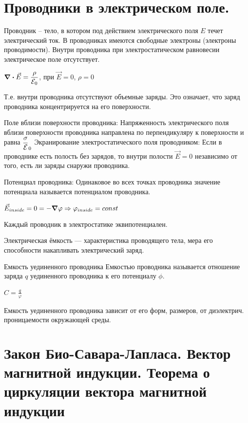 \documentclass[12pt]{report}
\begin{document}
\section{Проводники в электрическом поле.}
Проводник – тело, в котором под действием электрического поля $E$ течет электрический ток. В проводниках имеются свободные электроны (электроны проводимости).  Внутри проводника при электростатическом равновесии электрическое поле отсутствует.
\begin{center}
    $\div\vec{E} = \dfrac{\rho}{\varE_0}$, при $\vec{E} = 0$, $\rho = 0$
\end{center}

Т.е. внутри проводника отсутствуют
объемные заряды. Это означает, что заряд проводника концентрируется
на его поверхности.

Поле вблизи поверхности проводника: Напряженность электрического поля вблизи поверхности проводника направлена по перпендикуляру к поверхности и равна $\dfrac{\sigma}{\varE}_0$ Экранирование электростатического поля проводником: Если в проводнике есть полость без зарядов, то внутри полости $\vec{E} = 0$ независимо от того, есть ли заряды снаружи проводника.

Потенциал проводника: Одинаковое во всех точках проводника значение потенциала называется потенциалом проводника.
\begin{center}
    $\vec{E}_{inside} = 0 = -\grad \varphi \Rightarrow \varphi_{inside} = const$
\end{center}

Каждый проводник в электростатике
эквипотенциален.

Электрическая ёмкость --- характеристика проводящего тела, мера его способности накапливать электрический заряд.

Емкость уединенного проводника Емкостью проводника называется отношение заряда $q$ уединенного проводника к его потенциалу $\phi$.

\begin{center}
    $C = \frac{q}{\varphi}$
\end{center}

Емкость уединенного проводника зависит от его форм, размеров, от диэлектрич.  проницаемости окружающей среды.
\setcounter{section}{17}

\section{Закон Био-Савара-Лапласа. Вектор магнитной индукции. Теорема о циркуляции вектора магнитной индукции}
\end{document}

